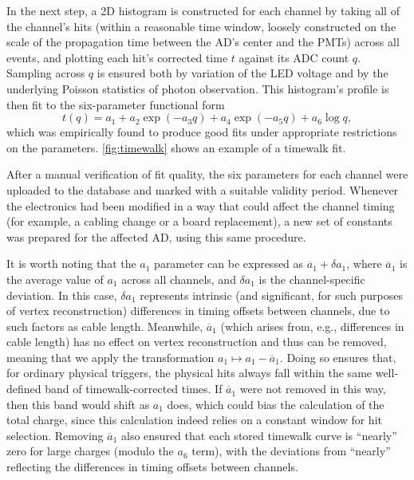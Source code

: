 \documentclass[../thesis.tex]{subfiles}
\begin{document}
In the next step, a 2D histogram is constructed for each channel by taking all
of the channel's hits (within a reasonable time window, loosely constructed on
the scale of the propagation time between the AD's center and the PMTs) across
all events, and plotting each hit's corrected time $t$ against its ADC count
$q$. Sampling across $q$ is ensured both by variation of the LED voltage and by
the underlying Poisson statistics of photon observation. This histogram's
profile is then fit to the six-parameter functional form
\begin{equation*}
  t(q) = a_1 + a_2 \exp (-a_3 q) + a_4 \exp (-a_5 q) + a_6 \log q,
\end{equation*}
which was empirically found to produce good fits under appropriate restrictions
on the parameters. \autoref{fig:timewalk} shows an example of a timewalk fit.

After a manual verification of fit quality, the six parameters for each channel
were uploaded to the database and marked with a suitable validity
period. Whenever the electronics had been modified in a way that could affect
the channel timing (for example, a cabling change or a board replacement), a new
set of constants was prepared for the affected AD, using this same procedure.

It is worth noting that the $a_1$ parameter can be expressed as $\overline a_1 +
\delta a_1$, where $\overline a_1$ is the average value of $a_1$ across all
channels, and $\delta a_1$ is the channel-specific deviation. In this case,
$\delta a_1$ represents intrinsic (and significant, for such purposes of vertex
reconstruction) differences in timing offsets between channels, due to such
factors as cable length. Meanwhile, $\overline a_1$ (which arises from, e.g.,
differences in cable length) has no effect on vertex reconstruction and thus can
be removed, meaning that we apply the transformation $a_1 \mapsto a_1 -
\overline a_1$. Doing so ensures that, for ordinary physical triggers, the
physical hits always fall within the same well-defined band of
timewalk-corrected times. If $\overline a_1$ were not removed in this way, then
this band would shift as $a_1$ does, which could bias the calculation of the
total charge, since this calculation indeed relies on a constant window for hit
selection. Removing $\overline a_1$ also ensured that each stored timewalk curve
is ``nearly'' zero for large charges (modulo the $a_6$ term), with the
deviations from ``nearly'' reflecting the differences in timing offsets between
channels.
\end{document}
